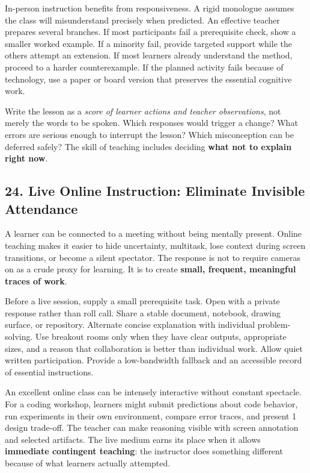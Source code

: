 In-person instruction benefits from responsiveness. A rigid monologue assumes the class will misunderstand precisely when predicted. An effective teacher prepares several branches. If most participants fail a prerequisite check, show a smaller worked example. If a minority fail, provide targeted support while the others attempt an extension. If most learners already understand the method, proceed to a harder counterexample. If the planned activity fails because of technology, use a paper or board version that preserves the essential cognitive work.

Write the lesson as a \emph{score of learner actions and teacher observations}, not merely the words to be spoken. Which responses would trigger a change? What errors are serious enough to interrupt the lesson? Which misconception can be deferred safely? The skill of teaching includes deciding \textbf{what not to explain right now}.

\subsection*{24. Live Online Instruction: Eliminate Invisible Attendance}

A learner can be connected to a meeting without being mentally present. Online teaching makes it easier to hide uncertainty, multitask, lose context during screen transitions, or become a silent spectator. The response is not to require cameras on as a crude proxy for learning. It is to create \textbf{small, frequent, meaningful traces of work}.

Before a live session, supply a small prerequisite task. Open with a private response rather than roll call. Share a stable document, notebook, drawing surface, or repository. Alternate concise explanation with individual problem-solving. Use breakout rooms only when they have clear outputs, appropriate sizes, and a reason that collaboration is better than individual work. Allow quiet written participation. Provide a low-bandwidth fallback and an accessible record of essential instructions.

An excellent online class can be intensely interactive without constant spectacle. For a coding workshop, learners might submit predictions about code behavior, run experiments in their own environment, compare error traces, and present 1 design trade-off. The teacher can make reasoning visible with screen annotation and selected artifacts. The live medium earns its place when it allows \textbf{immediate contingent teaching}: the instructor does something different because of what learners actually attempted.

